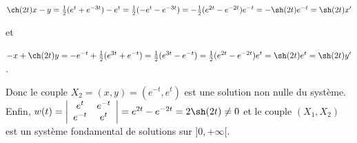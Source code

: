{\begin{enumerate}
{\begin{center}
$\ch(2t)x-y= \frac{1}{2}(e^{t}+e^{-3t})-e^{t}= \frac{1}{2}(-e^{t}-e^{-3t})=- \frac{1}{2}(e^{2t}-e^{-2t})e^{-t}=-\sh(2t)e^{-t}=\sh(2t)x'$
\end{center}

et

\begin{center}
$-x+\ch(2t)y=-e^{-t}+ \frac{1}{2}(e^{3t}+e^{-t})= \frac{1}{2}(e^{3t}-e^{-t})= \frac{1}{2}(e^{2t}-e^{-2t})e^{t}=\sh(2t)e^{t}=\sh(2t)y'$.
\end{center}

Donc le couple $X_2=(x,y)=(e^{-t},e^{t})$ est une solution non nulle du système. Enfin, $w(t)=\left|
\begin{array}{cc}
e^t&e^{-t}\\
e^{-t}&e^t
\end{array}
\right|=e^{2t}-e^{-2t}=2\sh(2t)\neq0$ et le couple $(X_1,X_2)$ est un système fondamental de solutions sur $]0,+\infty[$.

\begin{center}
\fbox{
$\mathcal{S}_{]0,+\infty[}=\left\{
t\mapsto\left(
\begin{array}{c}
\lambda e^t+\mu e^{-t}\\
\lambda e^{-t}+\mu e^t
\end{array}
\right),\;(\lambda,\mu)\in\Rr^2\right\}$.
}
\end{center}}
\end{enumerate}
}
